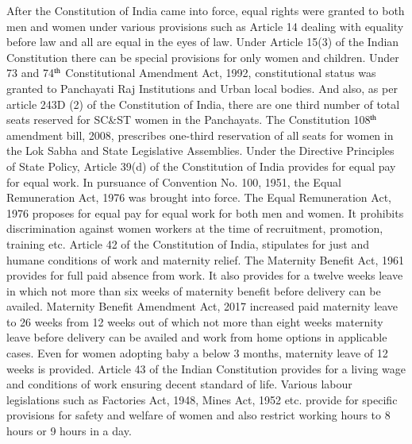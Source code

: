 \begin{multicols}{2}

\noi
After the Constitution of India came into force, equal rights were granted to both men and
women under various provisions such as Article 14 dealing with equality before law and all
are equal in the eyes of law. Under Article 15(3) of the Indian Constitution there can be
special provisions for only women and children. Under 73 and 74$^{\rm th}$ Constitutional
Amendment Act, 1992, constitutional status was granted to Panchayati Raj Institutions and
Urban local bodies. And also, as per article 243D (2) of the Constitution of India, there are
one third number of total seats reserved for SC\&ST women in the Panchayats. The
Constitution 108$^{\rm th}$ amendment bill, 2008, prescribes one-third reservation of all seats for
women in the Lok Sabha and State Legislative Assemblies. Under the Directive Principles of
State Policy, Article 39(d) of the Constitution of India provides for equal pay for equal work.
In pursuance of Convention No. 100, 1951, the Equal Remuneration Act, 1976 was brought
into force. The Equal Remuneration Act, 1976 proposes for equal pay for equal work for both 
men and women. It prohibits discrimination against women workers at the time of
recruitment, promotion, training etc. Article 42 of the Constitution of India, stipulates for just
and humane conditions of work and maternity relief. The Maternity Benefit Act, 1961
provides for full paid absence from work. It also provides for a twelve weeks leave in which
not more than six weeks of maternity benefit before delivery can be availed. Maternity
Benefit Amendment Act, 2017 increased paid maternity leave to 26 weeks from 12 weeks out
of which not more than eight weeks maternity leave before delivery can be availed and work
from home options in applicable cases. Even for women adopting baby a below 3 months,
maternity leave of 12 weeks is provided. Article 43 of the Indian Constitution provides for a
living wage and conditions of work ensuring decent standard of life. Various labour
legislations such as Factories Act, 1948, Mines Act, 1952 etc. provide for specific provisions
for safety and welfare of women and also restrict working hours to 8 hours or 9 hours in a
day.



\end{multicols}
